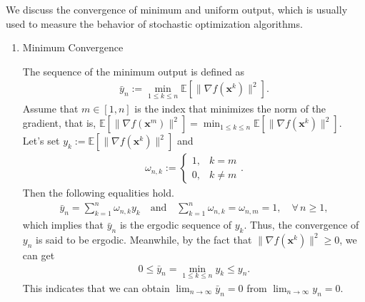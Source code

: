 \documentclass[twoside,11pt]{article}
\begin{document}
\begin{example}\label{e3}
We discuss the convergence of minimum and uniform output, which is usually used to measure the behavior of stochastic optimization algorithms.
\begin{enumerate}
\item[$(1)$]Minimum Convergence \citep{chen2019convergence,khaled2022better}
\par The sequence of the minimum output is defined as
\begin{align*}
	\bar{y}_{n}
	:=
	\min_{1\leq k\leq n}
	\mathbb{E}[\lVert \nabla f(\mathbf{x}^{k})\rVert^{2}].
\end{align*}
Assume that $m\in[1, n]$ is the index that minimizes the norm of the gradient, that is, $\mathbb{E}[\lVert\nabla f(\mathbf{x}^{m})\rVert^{2}]=\min_{1\leq k\leq n}\mathbb{E}[\lVert\nabla f(\mathbf{x}^{k})\rVert^{2}]$. Let's set $y_{k}:=\mathbb{E}[\lVert\nabla f(\mathbf{x}^{k})\rVert^{2}]$ and
\begin{align*}
	\omega_{n,k}
	:=
	\begin{cases}
		1,&k=m\\
		0,&k\neq m
	\end{cases}.
\end{align*}
Then the following equalities hold.
\begin{align*}
	\bar{y}_{n}
	=\sum_{k=1}^{n}
	\omega_{n,k}y_{k}
	\quad \text{and}
	\quad 
	\sum_{k=1}^{n}
	\omega_{n,k}=
	\omega_{n,m}
	=1,\quad 
	\forall\,n\geq 1,
\end{align*}
which implies that $\bar{y}_{n}$ is the ergodic sequence of $y_{k}$. Thus, the convergence of $y_{n}$ is said to be ergodic. Meanwhile, by the fact that $\lVert\nabla f(\mathbf{x}^{k})\rVert^{2}\geq 0$, we can get 
\begin{align*}
	0\leq \bar{y}_{n}
	=\min_{1\leq k\leq n}
	y_{k}
	\leq y_{n}.
\end{align*}
This indicates that we can obtain $\lim_{n\to\infty}\bar{y}_{n}=0$ from $\lim_{n\to\infty}y_{n}=0$.



\end{enumerate}
\end{example}
\end{document}
